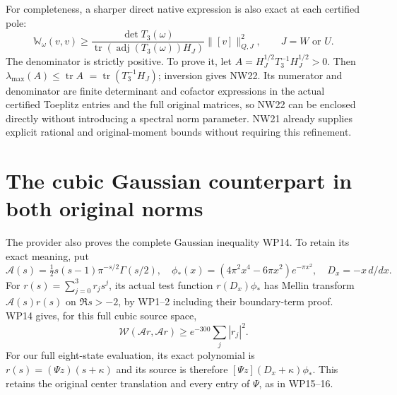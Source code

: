 \documentclass[11pt]{article}
\providecommand{\W}{\mathcal W}
\newcommand{\tr}{\operatorname{tr}}
\begin{document}
For completeness, a sharper direct native expression is
also exact at each certified pole:
\[
 \mathbb W_\omega(v,v)\ge
 \frac{\det T_3(\omega)}{\tr(\operatorname{adj}(T_3(\omega))H_J)}
                         \|[v]\|_{Q,J}^2,
 \qquad J=W\text{ or }U.
 \tag{NW22}
\]
The denominator is strictly positive. To prove it, let
$A=H_J^{1/2}T_3^{-1}H_J^{1/2}>0$. Then
$\lambda_{\max}(A)\le\tr A$
$=\tr(T_3^{-1}H_J)$; inversion gives NW22.
Its numerator and denominator are finite determinant and
cofactor expressions in the actual certified Toeplitz
entries and the full original matrices, so NW22 can be
enclosed directly without introducing a spectral norm
parameter. NW21 already supplies explicit rational and
original-moment bounds without requiring this refinement.

\section{The cubic Gaussian counterpart in both original norms}
The provider also proves the complete Gaussian inequality
WP14. To retain its exact meaning, put
\[
 \mathcal A(s)=\tfrac12s(s-1)\pi^{-s/2}\Gamma(s/2),\quad
 \phi_*(x)=(4\pi^2x^4-6\pi x^2)e^{-\pi x^2},\quad
 D_x=-x\,d/dx.
 \tag{NW23}
\]
For $r(s)=\sum_{j=0}^3r_js^j$, its actual test function
$r(D_x)\phi_*$ has Mellin transform $\mathcal A(s)r(s)$
on $\Re s>-2$, by WP1--2 including their boundary-term
proof. WP14 gives, for this full cubic source space,
\[
 \W(\mathcal A r,\mathcal A r)\ge e^{-300}\sum_j|r_j|^2.
 \tag{NW24}
\]
For our full eight-state evaluation, its exact polynomial
is $r(s)=(\Psi z)(s+\kappa)$ and its source is therefore
$[\Psi z](D_x+\kappa)\phi_*$. This retains the original
center translation and every entry of $\Psi$, as in WP15--16.
\end{document}

